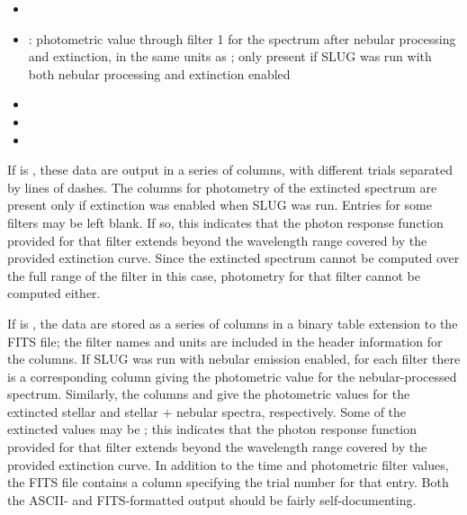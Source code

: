 \documentclass[letterpaper,10pt,english]{sphinxmanual}
\begin{document}
\begin{itemize}
\item {} 

\item {} 
: photometric value through filter 1 for the spectrum after nebular processing and extinction, in the same units as ; only present if SLUG was run with both nebular processing and extinction enabled

\item {} 

\item {} 

\item {} 

\end{itemize}

If  is , these data are output in a series of
columns, with different trials separated by lines of dashes. The
columns for photometry of the extincted spectrum are present only if
extinction was enabled when SLUG was run. Entries for some filters may
be left blank. If so, this indicates that the photon response function
provided for that filter extends beyond the wavelength range covered
by the provided extinction curve. Since the extincted spectrum cannot
be computed over the full range of the filter in this case, photometry
for that filter cannot be computed either.

If  is , the data are stored as a series of
columns in a binary table extension to the FITS file; the filter names
and units are included in the header information for the columns. If
SLUG was run with nebular emission enabled, for each filter 
there is a corresponding column  giving the photometric
value for the nebular-processed spectrum. Similarly, the columns
 and  give the photometric values
for the extincted stellar and stellar + nebular spectra, respectively.
Some of the extincted values may be ; this
indicates that the photon response function provided for that filter
extends beyond the wavelength range covered by the provided extinction
curve. In addition to the time and photometric filter values, the FITS
file contains a column specifying the trial number for that
entry. Both the ASCII- and FITS-formatted output should be fairly
self-documenting.
\end{document}
